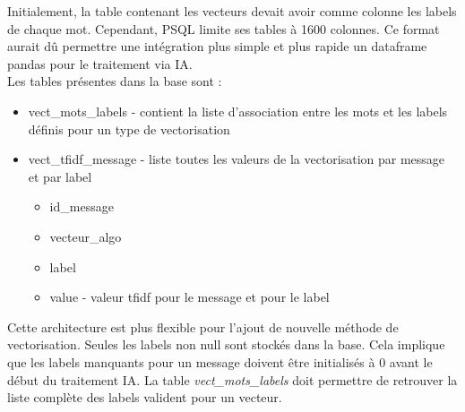             Initialement, la table contenant les vecteurs devait avoir comme colonne les labels de chaque mot.
            Cependant, PSQL limite ses tables à 1600 colonnes.
            Ce format aurait dû permettre une intégration plus simple et plus rapide un dataframe pandas pour le traitement via IA\@.\\
            Les tables présentes dans la base sont :
            \begin{itemize}
                \item vect\_mots\_labels - contient la liste d'association entre les mots et les labels définis pour un type de vectorisation
                \item vect\_tfidf\_message - liste toutes les valeurs de la vectorisation par message et par label
                \begin{itemize}
                    \item id\_message
                    \item vecteur\_algo
                    \item label
                    \item value - valeur tfidf pour le message et pour le label
                \end{itemize}
            \end{itemize}
            Cette architecture est plus flexible pour l'ajout de nouvelle méthode de vectorisation.
            Seules les labels non null sont stockés dans la base.
            Cela implique que les labels manquants pour un message doivent être initialisés à 0 avant le début du traitement IA\@.
            La table \emph{vect\_mots\_labels} doit permettre de retrouver la liste complète des labels valident pour un vecteur.

